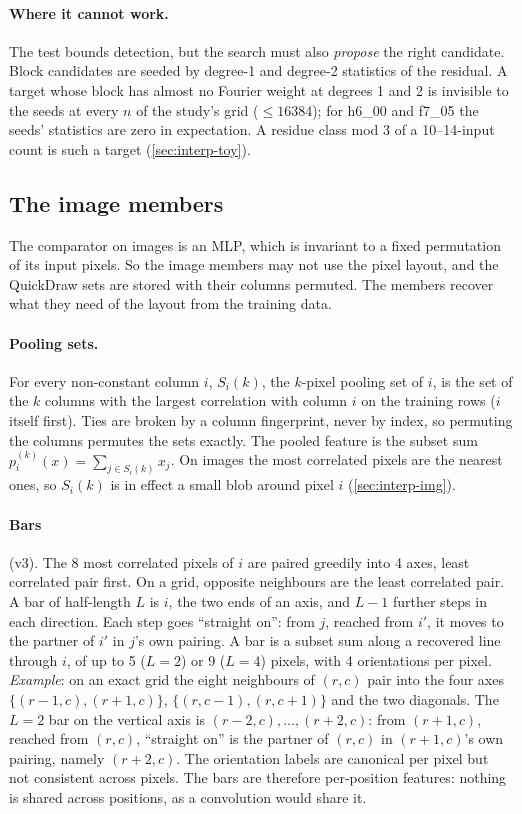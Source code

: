 \paragraph{Where it cannot work.} The test bounds detection, but the search must also \emph{propose} the right candidate. Block candidates are seeded by degree-1 and degree-2 statistics of the residual. A target whose block has almost no Fourier weight at degrees 1 and 2 is invisible to the seeds at every $n$ of the study's grid ($\le16384$); for h6\_00 and f7\_05 the seeds' statistics are zero in expectation. A residue class mod 3 of a 10--14-input count is such a target (\cref{sec:interp-toy}).

\subsection{The image members}\label{sec:image}

The comparator on images is an MLP, which is invariant to a fixed permutation of its input pixels. So the image members may not use the pixel layout, and the QuickDraw sets are stored with their columns permuted. The members recover what they need of the layout from the training data.

\paragraph{Pooling sets.} For every non-constant column $i$, $S_i(k)$, the $k$-pixel pooling set of $i$, is the set of the $k$ columns with the largest correlation with column $i$ on the training rows ($i$ itself first). Ties are broken by a column fingerprint, never by index, so permuting the columns permutes the sets exactly. The pooled feature is the subset sum $p_i^{(k)}(x)=\sum_{j\in S_i(k)}x_j$. On images the most correlated pixels are the nearest ones, so $S_i(k)$ is in effect a small blob around pixel $i$ (\cref{sec:interp-img}).

\paragraph{Bars} (v3). The 8 most correlated pixels of $i$ are paired greedily into 4 axes, least correlated pair first. On a grid, opposite neighbours are the least correlated pair. A bar of half-length $L$ is $i$, the two ends of an axis, and $L-1$ further steps in each direction. Each step goes ``straight on'': from $j$, reached from $i'$, it moves to the partner of $i'$ in $j$'s own pairing. A bar is a subset sum along a recovered line through $i$, of up to 5 ($L=2$) or 9 ($L=4$) pixels, with 4 orientations per pixel. \emph{Example}: on an exact grid the eight neighbours of $(r,c)$ pair into the four axes $\{(r-1,c),(r+1,c)\}$, $\{(r,c-1),(r,c+1)\}$ and the two diagonals. The $L=2$ bar on the vertical axis is $(r-2,c),\dots,(r+2,c)$: from $(r+1,c)$, reached from $(r,c)$, ``straight on'' is the partner of $(r,c)$ in $(r+1,c)$'s own pairing, namely $(r+2,c)$. The orientation labels are canonical per pixel but not consistent across pixels. The bars are therefore per-position features: nothing is shared across positions, as a convolution would share it.

